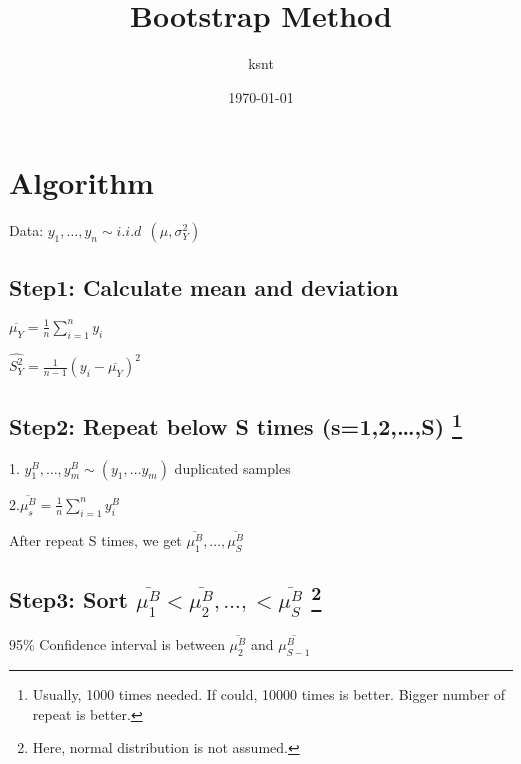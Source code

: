 \documentclass[twocolumn,10pt]{article}
\begin{document}
\title{Bootstrap Method}
\author{ksnt}
\date{\today}

\maketitle

\section{Algorithm}

Data: $y_1, \dots , y_n \sim i.i.d ~~ (\mu,\sigma_{Y}^2)$ 

\subsection*{Step1:  Calculate mean and deviation} \par 

$ \overline{\mu_{Y}} = \frac{1}{n} \sum_{i=1}^{n} y_i $

\par

$\widehat{S_{Y}^2} = \frac{1}{n-1} (y_i - \overline{\mu_{Y}})^2$
 
\subsection*{Step2: Repeat below S times (s=1,2,\dots,S) \footnote{Usually, 1000 times needed. If could, 10000 times is better. Bigger number of repeat is better.}} \par 

1. $y_{1}^B, \dots, y_m^{B} \sim (y_1, \dots y_m)$   duplicated samples

2.$ \overline{\mu^{B}_{s}} = \frac{1}{n} \sum_{i=1}^{n} y^{B}_i$

After repeat S times, we get $ \overline{\mu^{B}_{1}}, \dots, \overline{\mu^{B}_{S}} $

\subsection*{Step3: Sort $ \overline{\mu^{B}_{1}} < \overline{\mu^{B}_{2}}, \dots, < \overline{\mu^{B}_{S}}$  \footnote{Here, normal distribution is not assumed.} }

95\% Confidence interval is between $\overline{\mu^{B}_{2}}$ and $\overline{\mu^{B}_{S-1}}$
\end{document}
